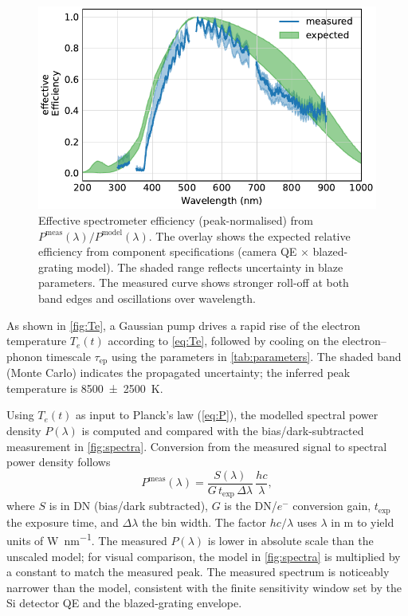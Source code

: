 \documentclass[
	parskip=half,
	a4paper,
]{scrarticle}
\begin{document}
\begin{figure}
    \centering
    \includegraphics{../analysis/figures/efficiency de.pdf}
    \caption{Effective spectrometer efficiency (peak-normalised) from \(P^{\text{meas}}(\lambda)/P^{\text{model}}(\lambda)\). The overlay shows the expected relative efficiency from component specifications (camera QE \(\times\) blazed-grating model). The shaded range reflects uncertainty in blaze parameters. The measured curve shows stronger roll-off at both band edges and oscillations over wavelength.}
    \label{fig:efficiency}
\end{figure}

As shown in \autoref{fig:Te}, a Gaussian pump drives a rapid rise of the electron temperature \(T_e(t)\) according to \autoref{eq:Te}, followed by cooling on the electron–phonon timescale \(\tau_{\mathrm{ep}}\) using the parameters in \autoref{tab:parameters}. The shaded band (Monte Carlo) indicates the propagated uncertainty; the inferred peak temperature is \SI{8500(2500)}{\kelvin}.

Using \(T_e(t)\) as input to Planck’s law (\autoref{eq:P}), the modelled spectral power density \(P(\lambda)\) is computed and compared with the bias/dark-subtracted measurement in \autoref{fig:spectra}. Conversion from the measured signal to spectral power density follows
\begin{equation}
  P^{\text{meas}}(\lambda)
  = \frac{S(\lambda)}{G\,t_{\text{exp}}\,\Delta\lambda}\,\frac{hc}{\lambda},
\end{equation}
where \(S\) is in DN (bias/dark subtracted), \(G\) is the DN/\(e^-\) conversion gain, \(t_{\text{exp}}\) the exposure time, and \(\Delta\lambda\) the bin width. The factor \(hc/\lambda\) uses \(\lambda\) in \si{\metre} to yield units of \si{\watt\per\nano\metre}. The measured \(P(\lambda)\) is lower in absolute scale than the unscaled model; for visual comparison, the model in \autoref{fig:spectra} is multiplied by a constant to match the measured peak. The measured spectrum is noticeably narrower than the model, consistent with the finite sensitivity window set by the Si detector QE and the blazed-grating envelope.
\end{document}

